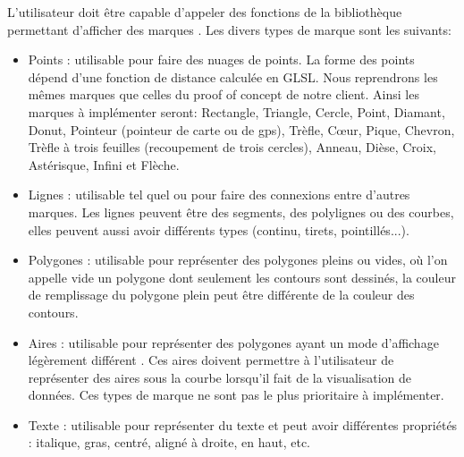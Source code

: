 \documentclass[12pt]{article}
\begin{document}
L'utilisateur doit être capable d'appeler des fonctions de la bibliothèque permettant d'afficher des
\gls{marque}s \cite{VegaMarks}. Les divers types de marque sont les suivants:
	\begin{itemize}
	\item Points : utilisable pour faire des nuages de points. La forme des points dépend d'une fonction de
    distance calculée en GLSL. Nous reprendrons les mêmes marques que celles du proof of concept de notre client.
    Ainsi les marques à implémenter seront: Rectangle, Triangle, Cercle, Point, Diamant, Donut, Pointeur (pointeur de carte ou de gps), Trèfle, Cœur, 
Pique, Chevron, Trèfle à trois feuilles (recoupement de trois cercles), Anneau, Dièse, Croix, Astérisque, Infini et Flèche.
    \item Lignes : utilisable tel quel ou pour faire des connexions entre d'autres marques. Les lignes
    peuvent être des segments, des polylignes ou des courbes, elles peuvent aussi avoir différents types
    (continu, tirets, pointillés...).
    \item Polygones : utilisable pour représenter des polygones pleins ou vides, où l'on appelle vide un
    polygone dont seulement les contours sont dessinés, la couleur de remplissage du polygone plein peut être
    différente de la couleur des contours.
    \item Aires : utilisable pour représenter des polygones ayant un mode d'affichage légèrement différent
    \cite{VegaMarks}. Ces aires doivent permettre à l'utilisateur de représenter des aires sous la courbe lorsqu'il fait de la
    visualisation de données. Ces types de marque ne sont pas le plus prioritaire à implémenter.
    \item Texte : utilisable pour représenter du texte et peut avoir différentes propriétés : italique,
    gras, centré, aligné à droite, en haut, etc.
    \end{itemize}
\end{document}
